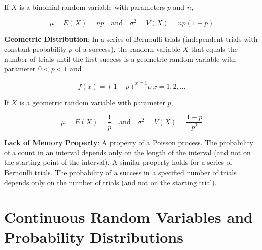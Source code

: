 \documentclass{article}
\begin{document}
If $X$ is a binomial random variable with parameters $p$ and $n$,

$$\mu=E(X)=np\quad\text{and}\quad\sigma^2=V(X)=np(1-p)$$

\noindent\textbf{\color{blue}Geometric Distribution}: In a series of Bernoulli trials (independent trials with constant probability $p$ of a success), the random variable $X$ that equals the number of trials until the first success is a geometric random variable with parameter $0<p<1$ and 

$$f(x)=(1-p)^{x=1}p\ x=1,2,\ldots$$

If $X$ is a geometric random variable with parameter $p$,

$$\mu=E(X)=\frac{1}{p}\quad\text{and}\quad\sigma^2=V(X)=\frac{1-p}{p^2}$$

\noindent\textbf{Lack of Memory Property}: A property of a Poisson process. The probability of a count in an interval depends only on the length of the interval (and not on the starting point of the interval). A similar property holds for a series of Bernoulli trials. The probability of a success in a specified number of trials depends only on the number of trials (and not on the starting trial).

\section{Continuous Random Variables and Probability Distributions}
\end{document}
